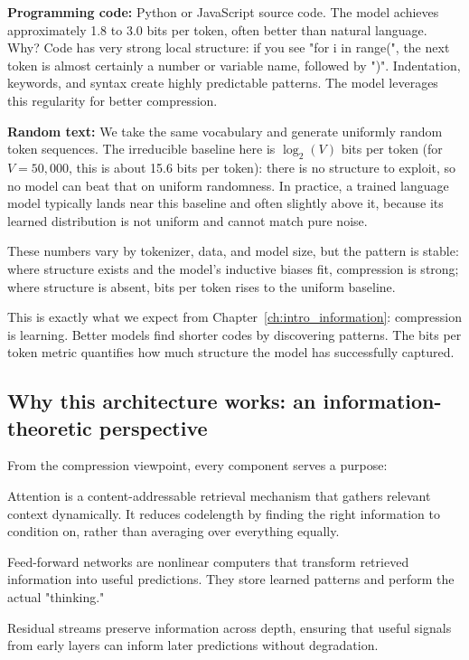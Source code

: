 \textbf{Programming code:} Python or JavaScript source code. The model achieves approximately 1.8 to 3.0 bits per token, often better than natural language. Why? Code has very strong local structure: if you see "for i in range(", the next token is almost certainly a number or variable name, followed by ")". Indentation, keywords, and syntax create highly predictable patterns. The model leverages this regularity for better compression.

\textbf{Random text:} We take the same vocabulary and generate uniformly random token sequences. The irreducible baseline here is $\log_2(V)$ bits per token (for $V=50{,}000$, this is about 15.6 bits per token): there is no structure to exploit, so no model can beat that on uniform randomness. In practice, a trained language model typically lands near this baseline and often slightly above it, because its learned distribution is not uniform and cannot match pure noise.

These numbers vary by tokenizer, data, and model size, but the pattern is stable: where structure exists and the model's inductive biases fit, compression is strong; where structure is absent, bits per token rises to the uniform baseline.

This is exactly what we expect from Chapter~\ref{ch:intro_information}: compression is learning. Better models find shorter codes by discovering patterns. The bits per token metric quantifies how much structure the model has successfully captured.

\subsection{Why this architecture works: an information-theoretic perspective}
\label{sec:why_transformer_works}

From the compression viewpoint, every component serves a purpose:

Attention is a content-addressable retrieval mechanism that gathers relevant context dynamically. It reduces codelength by finding the right information to condition on, rather than averaging over everything equally.

Feed-forward networks are nonlinear computers that transform retrieved information into useful predictions. They store learned patterns and perform the actual "thinking."

Residual streams preserve information across depth, ensuring that useful signals from early layers can inform later predictions without degradation.

